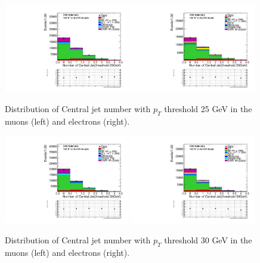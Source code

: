 \begin{figure}
\begin{center}
\includegraphics[width=0.49\textwidth]{figs/n-1_plots_mu/mu_EWK_W_2jets_centraljetnum_25_mjj_600_tagjet1_60_tagjet2_50_Zeppenfield_1point2_EWKW2jets.pdf}
\includegraphics[width=0.49\textwidth]{figs/n-1_plots_el/el_EWK_W_2jets_centraljetnum_25_mjj_600_tagjet1_60_tagjet2_50_Zeppenfield_1point2_met_30_WmT_30_EWKW2jets.pdf}
\end{center}
\caption{Distribution of Central jet number with $p_{T}$ threshold 25 GeV in the muons (left) and electrons (right).}
\label{fig:centraljetnumer_25}
\end{figure}

\begin{figure}
\begin{center}
\includegraphics[width=0.49\textwidth]{figs/n-1_plots_mu/mu_EWK_W_2jets_centraljetnum_30_mjj_600_tagjet1_60_tagjet2_50_Zeppenfield_1point2_EWKW2jets.pdf}
\includegraphics[width=0.49\textwidth]{figs/n-1_plots_el/el_EWK_W_2jets_centraljetnum_30_mjj_600_tagjet1_60_tagjet2_50_Zeppenfield_1point2_met_30_WmT_30_EWKW2jets.pdf}
\end{center}
\caption{Distribution of Central jet number with $p_{T}$ threshold 30 GeV in the muons (left) and electrons (right).}
\label{fig:centraljetnumer_30}
\end{figure}

